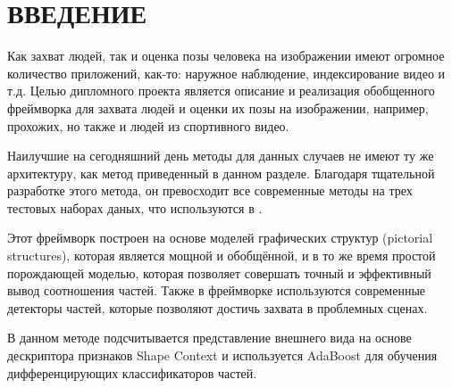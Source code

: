 \section*{ВВЕДЕНИЕ}
Как захват людей, так и оценка позы человека на изображении имеют огромное количество приложений, как-то: наружное наблюдение, индексирование видео и т.д. Целью дипломного проекта является описание и реализация обобщенного фреймворка для захвата людей и оценки их позы на изображении, например, прохожих, но также и людей из спортивного видео.

Наилучшие на сегодняшний день методы для данных случаев не имеют ту же архитектуру, как метод приведенный в данном разделе. Благодаря тщательной разработке этого метода, он превосходит все современные методы на трех тестовых наборах даных, что используются в \cite{andriluka09}.

Этот фреймворк построен на основе моделей графических структур (pictorial structures), которая является мощной и обобщённой, и в то же время простой порождающей моделью, которая позволяет совершать точный и эффективный вывод соотношения частей. Также в фреймворке используются современные детекторы частей, которые позволяют достичь захвата в проблемных сценах.

В данном методе подсчитывается представление внешнего вида на основе дескриптора признаков Shape Context и используется AdaBoost для обучения дифференцирующих классификаторов частей.

\newpage
